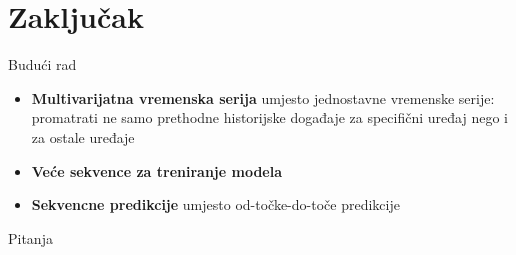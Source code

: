 \documentclass{beamer}
\begin{document}
  \section{Zaključak}
  \begin{frame}{Budući rad}
    \begin{itemize}
      \item \textbf{Multivarijatna vremenska serija} umjesto jednostavne vremenske serije: promatrati ne samo prethodne historijske događaje za specifični uređaj nego i za ostale uređaje
      \item \textbf{Veće sekvence za treniranje modela}
      \item \textbf{Sekvencne predikcije} umjesto od-točke-do-toče predikcije
    \end{itemize}
  \end{frame}

  \begin{frame}[standout]
    Pitanja
  \end{frame}

  
\end{document}
